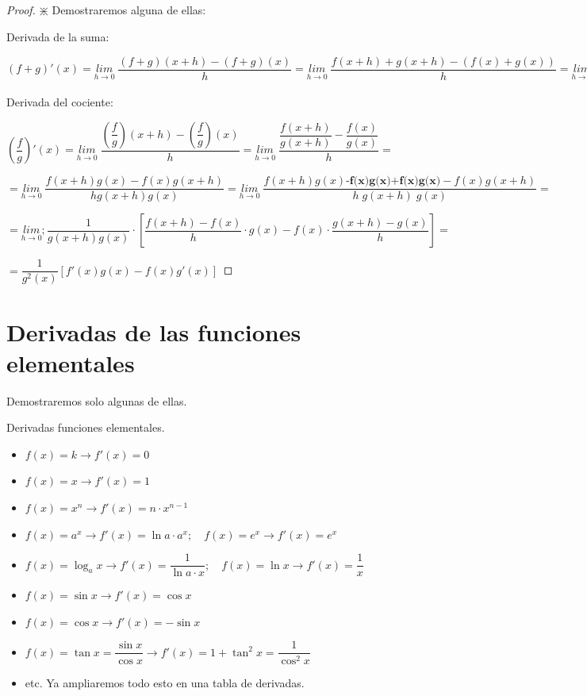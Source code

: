 	\begin{proof}
		
		$\divideontimes$  Demostraremos alguna de ellas:
		
		Derivada de la suma:
		
		$(f+g)'(x)=\underset {h\to 0}{lim}\;{\dfrac {(f+g)(x+h)-(f+g)(x)}{h}}=\underset {h\to 0}{lim}\;{\dfrac {f(x+h)+g(x+h)-(f(x)+g(x))}{h}}=\underset {h\to 0}{lim}\;{\left\{\dfrac {f(x+h)-f(x)}{h}+\dfrac {g(x+h)-g(x)}{h}\right\}}=\underset {h\to 0}{lim}\;{\dfrac {f(x+h)-f(x)}{h}}+ \underset {h\to 0}{lim}\;{\dfrac {g(x+h)-g(x)}{h}}=f'(x)+g'(x)$
		
		Derivada del cociente:
		
		$\left( \dfrac f g \right)'(x)=\underset{h\to 0}{lim}\;
		{ \dfrac { \left(\dfrac{f}{g}\right)(x+h)-\left(\dfrac{f}{g}\right)(x)   }{h}}= \underset {h\to 0}{lim}\;{\dfrac { \dfrac {f(x+h)}{g(x+h)} - \dfrac{f(x)}{g(x)} }{h}}=$
		
		$ =\underset {h\to 0}{lim}\; {\dfrac {f(x+h)g(x)-f(x)g(x+h) }{h g(x+h)g(x)}}= \underset {h\to 0}{lim}\; {\dfrac {f(x+h)g(x) \textbf{-f(x)g(x)+f(x)g(x)}-f(x)g(x+h) }{h \; g(x+h)\; g(x)}}=$
		
		$=\underset {h\to 0}{lim};{\dfrac {1}{g(x+h)g(x)} \cdot \left[ \dfrac {f(x+h)-f(x)}{h}\cdot g(x) - f(x)\cdot \dfrac {g(x+h)-g(x)}{h} \right]}=$
		
		$=\dfrac {1}{g^2(x)}[f'(x)g(x)-f(x)g'(x)]$
		
		
	\end{proof}
	
	\section{Derivadas de las funciones elementales}
	
	Demostraremos solo algunas de ellas.
	
	\begin{teor} Derivadas funciones elementales.
		
		\begin{itemize}
			\item $f(x)=k \to f'(x)=0$
			\item $f(x)=x \to f'(x)=1$
			\item $f(x)=x^n \to f'(x)=n\cdot x^{n-1}$
			\item $f(x)=a^x \to f'(x)=\ln a \cdot a^x; \quad f(x)=e^x \to f'(x)=e^x$
			\item $f(x)=\log_a x \to f'(x)=\dfrac {1}{\ln a \cdot x}; \quad f(x)=\ln x \to f'(x)=\dfrac 1 x$
			\item $f(x)=\sin x \to f'(x)=\cos x$
			\item $f(x)=\cos x \to f'(x)=-\sin x$
			\item $f(x)=\tan x =\dfrac {\sin x}{\cos x}\to f'(x)=1+\tan^2 x= \dfrac {1}{\cos^2 x}$
			\item etc. Ya ampliaremos todo esto en una tabla de derivadas.
		\end{itemize}
		
	\end{teor}

